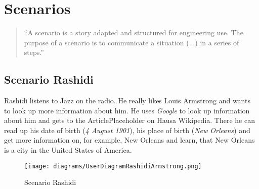 \chapter{Scenarios}

\begin{quote}
``A scenario is a story adapted and structured for engineering use. The purpose of a scenario is to communicate a situation (...) in a series of steps.''  
\end{quote} \citep[98]{scenario}

\section{Scenario Rashidi}
Rashidi listens to Jazz on the radio. He really likes Louis Armstrong and wants to look up more information about him. He uses \textit{Google} to look up information about him and gets to the ArticlePlaceholder on Hausa Wikipedia. There he can read up his date of birth (\textit{4 August 1901}), his place of birth (\textit{New Orleans}) \citep{wd:03} and get more information on, for example, New Orleans and learn, that New Orleans is a city in the United States of America. 
\begin{figure}[H]
	\centering
	\texttt{[image: diagrams/UserDiagramRashidiArmstrong.png]}
	\caption{Scenario Rashidi}
	\label{fig:ScenarioRashidi}
\end{figure}

